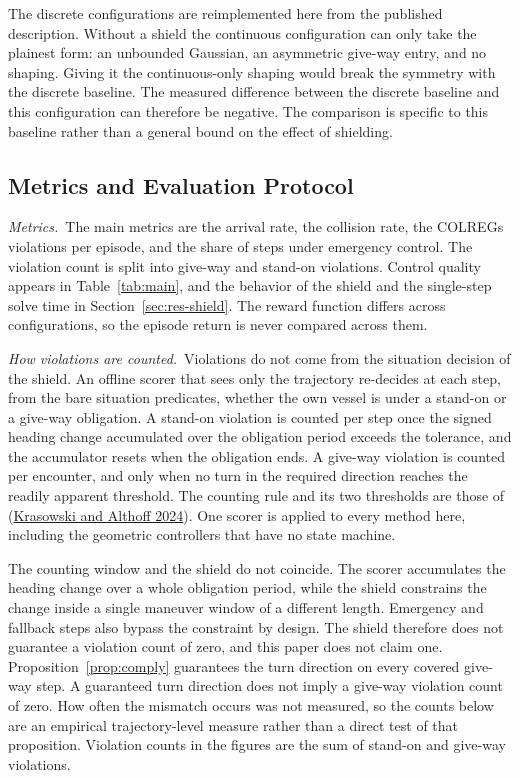 \documentclass[10pt,letterpaper]{article}
\newcommand{\citl}[2]{(\hyperlink{ref:#1}{#2})}
\begin{document}
 The discrete configurations are reimplemented here from the published description.
Without a shield the continuous configuration can only take the plainest form: an unbounded Gaussian, an asymmetric
give-way entry, and no shaping. Giving it the continuous-only shaping would break the
symmetry with the discrete baseline. The measured difference between the discrete baseline and this configuration can
therefore be negative. The comparison is specific to this baseline rather than a general
bound on the effect of shielding.

\subsection{Metrics and Evaluation Protocol}
\label{sec:metrics}

\noindent\textit{Metrics.}\ The main metrics are the arrival rate, the collision rate, the COLREGs violations per
episode, and the share of steps under emergency control. The violation count is split
into give-way and stand-on violations. Control quality appears in Table~\ref{tab:main},
and the behavior of the shield and the single-step solve time in
Section~\ref{sec:res-shield}. The reward function differs across configurations, so the
episode return is never compared across them.

\noindent\textit{How violations are counted.}\ Violations do not come from the situation
decision of the shield. An offline scorer that sees only the trajectory re-decides at
each step, from the bare situation predicates, whether the own vessel is under a
stand-on or a give-way obligation. A stand-on violation is counted per step once the
signed heading change accumulated over the obligation period exceeds the tolerance, and
the accumulator resets when the obligation ends. A give-way violation is counted per
encounter, and only when no turn in the required direction reaches the readily apparent
threshold. The counting rule and its two thresholds are those of \citl{krasowski2024}{Krasowski and
Althoff 2024}. One scorer is applied to every method here, including the geometric
controllers that have no state machine.

The counting window and the shield do not coincide. The scorer
accumulates the heading change over a whole obligation period, while the shield
constrains the change inside a single maneuver window of a different length. Emergency
and fallback steps also bypass the constraint by design. The shield therefore does not guarantee a violation count of zero, and this paper does
not claim one. Proposition~\ref{prop:comply} guarantees the turn direction on every
covered give-way step. A guaranteed turn direction does not imply a give-way violation count of zero. How often the
mismatch occurs was not measured, so the counts below are an empirical trajectory-level
measure rather than a direct test of that proposition. Violation counts in the figures
are the sum of stand-on and give-way violations.
\end{document}
